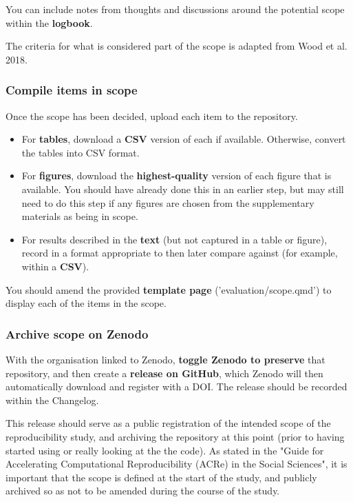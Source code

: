 You can include notes from thoughts and discussions around the potential scope within the \textbf{logbook}.

The criteria for what is considered part of the scope is adapted from Wood et al. 2018.\autocite{wood_replication_2018, wood_push_2018}

\vspace{0.5cm}
\subsubsection{Compile items in scope}

Once the scope has been decided, upload each item to the repository.

\begin{itemize}
    \item For \textbf{tables}, download a \textbf{CSV} version of each if available. Otherwise, convert the tables into CSV format.
    \item For \textbf{figures}, download the \textbf{highest-quality} version of each figure that is available. You should have already done this in an earlier step, but may still need to do this step if any figures are chosen from the supplementary materials as being in scope.
    \item For results described in the \textbf{text} (but not captured in a table or figure), record in a format appropriate to then later compare against (for example, within a \textbf{CSV}).
\end{itemize}

You should amend the provided \textbf{template page} ('evaluation/scope.qmd') to display each of the items in the scope.

\vspace{0.5cm}
\subsubsection{Archive scope on Zenodo}

With the organisation linked to Zenodo, \textbf{toggle Zenodo to preserve} that repository, and then create a \textbf{release on GitHub}, which Zenodo will then automatically download and register with a DOI. The release should be recorded within the Changelog.

This release should serve as a public registration of the intended scope of the reproducibility study, and archiving the repository at this point (prior to having started using or really looking at the the code). As stated in the "Guide for Accelerating Computational Reproducibility (ACRe) in the Social Sciences", it is important that the scope is defined at the start of the study, and publicly archived so as not to be amended during the course of the study.\cite{berkeley_initiative_for_transparency_in_the_social_sciences_guide_2022}

